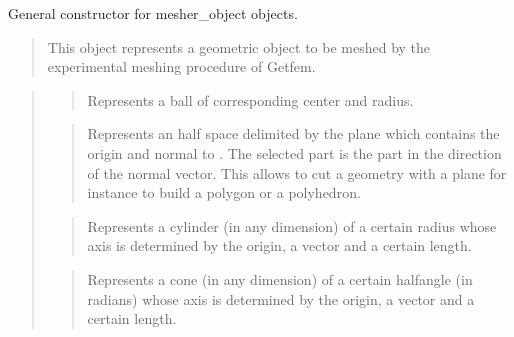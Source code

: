 \documentclass[a4paper,11pt,english]{sphinxmanual}
\begin{document}
\sphinxAtStartPar
{}

\sphinxAtStartPar
General constructor for mesher\_object objects.
\begin{quote}

\sphinxAtStartPar
This object represents a geometric object to be meshed by the
experimental meshing procedure of Getfem.
\end{quote}

\sphinxAtStartPar
{}
\begin{quote}

\sphinxAtStartPar
{}
\begin{quote}

\sphinxAtStartPar
Represents a ball of corresponding center and radius.
\end{quote}

\sphinxAtStartPar
{}
\begin{quote}

\sphinxAtStartPar
Represents an half space delimited by the plane which contains the
origin and normal to . The selected part is the part
in the direction of the normal vector. This allows to cut a geometry
with a plane for instance to build a polygon or a polyhedron.
\end{quote}

\sphinxAtStartPar
{}
\begin{quote}

\sphinxAtStartPar
Represents a cylinder (in any dimension) of a certain radius whose axis
is determined by the origin, a vector  and a certain length.
\end{quote}

\sphinxAtStartPar
{}
\begin{quote}

\sphinxAtStartPar
Represents a cone (in any dimension) of a certain half\sphinxhyphen{}angle (in radians)
whose axis is determined by the origin, a vector  and a certain length.
\end{quote}


\end{quote}
\end{document}
